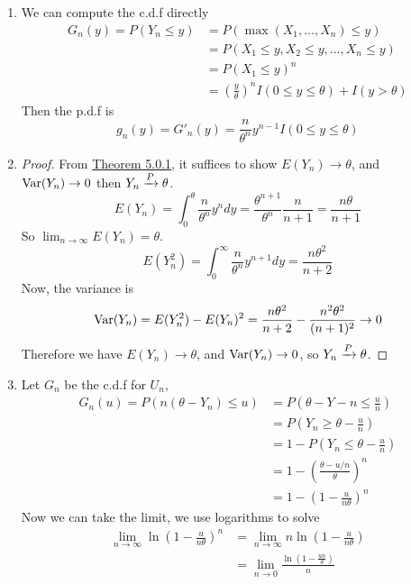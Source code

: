 \documentclass[openany]{report}
\begin{document}
    \begin{enumerate}[label=(\roman*)]
        \item We can compute the c.d.f directly 
        \begin{align*}
            G_n(y) = P(Y_n \leq y) &= P(\max(X_1, \ldots, X_n) \leq y)\\
            &= P(X_1\leq y, X_2 \leq y, \ldots, X_n \leq y)\\
            &= P(X_1\leq y)^n\\
        &= \left(\frac{y}{\theta}\right)^nI(0 \leq y \leq \theta) + I(y > \theta)
    \end{align*}
    Then the p.d.f is 
    \[g_n(y) = G'_n(y) = \frac{n}{\theta^n}y^{n-1}I(0 \leq y \leq \theta)\]
    \item 
    \begin{proof}
        From \hyperref[theorem:5.0.1]{Theorem 5.0.1}, it suffices to show $E(Y_n) \rightarrow \theta$, and $\operatorname{Var}(Y_n) \rightarrow 0$ then $Y_n \xrightarrow{P} \theta$. 
        \[E(Y_n) = \int_0^\theta \frac{n}{\theta^n}y^ndy = \frac{\theta^{n+1}}{\theta^n}\frac{n}{n+1} = \frac{n\theta}{n+1}\]
        So $\lim_{n\rightarrow\infty}E(Y_n) = \theta$.
        \[E(Y_n^2) = \int_0^\infty \frac{n}{\theta^n}y^{n+1}dy  = \frac{n\theta^2}{n+2} \]
        Now, the variance is 
        \[\operatorname{Var}(Y_n) = E(Y_n^2) - E(Y_n)^2 = \frac{n\theta^2}{n+2} - \frac{n^2\theta^2}{(n+1)^2} \rightarrow 0\]
        Therefore we have $E(Y_n) \rightarrow \theta$, and $\operatorname{Var}(Y_n) \rightarrow 0$, so $Y_n \xrightarrow{P} \theta$. 
    \end{proof}
    \item Let $G_n$ be the c.d.f for $U_n$, 
    \begin{align*}
        G_n(u) = P(n(\theta-Y_n) \leq u) &= P\left(\theta - Y-n \leq \frac{u}{n}\right)\\
        &= P\left(Y_n \geq \theta - \frac{u}{n}\right)\\
        &= 1 - P\left(Y_n \leq \theta - \frac{u}{n}\right)\\
        &= 1 - \left(\frac{\theta - u/n}{\theta}\right)^n\\
        &= 1 - \left(1 - \frac{u}{n\theta}\right)^n
    \end{align*}
    Now we can take the limit, we use logarithms to solve 
    \begin{align*}
        \lim_{n\rightarrow\infty} \ln\left(1 - \frac{u}{n\theta}\right)^n &= \lim_{n\rightarrow \infty} n\ln\left(1 - \frac{u}{n\theta}\right) \\
        &= \lim_{n\rightarrow 0}\frac{\ln\left(1 - \frac{un}{\theta}\right)}{n}\tag{Change $n$ to $1/n$}\\

\end{align*}
\end{enumerate}
\end{document}
